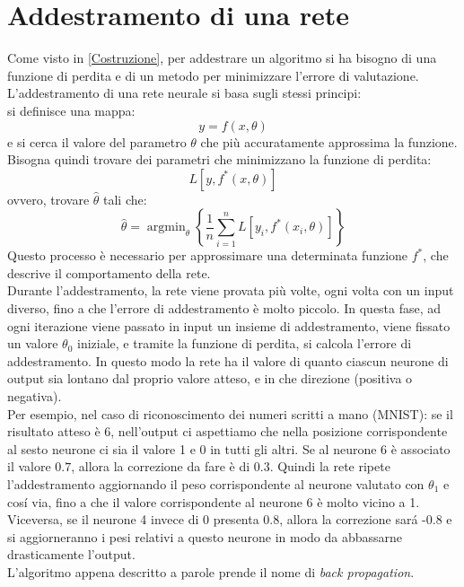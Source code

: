 \documentclass[a4paper,12pt,oneside]{book}
\DeclareMathOperator*{\argmin}{argmin}
\begin{document}
\section{Addestramento di una rete}
Come visto in \ref{Costruzione}, per addestrare un algoritmo si ha bisogno di una funzione di perdita e di un metodo per minimizzare l'errore di valutazione.\\
L'addestramento di una rete neurale si basa sugli stessi principi:\\
si definisce una mappa: $$y=f(x,\theta)$$ e si cerca il valore del parametro $\theta$ che pi\`{u} accuratamente approssima la funzione.
Bisogna quindi trovare dei parametri che minimizzano la funzione di perdita:
$$L[y,f^*(x,\theta)]$$
ovvero, trovare $\hat{\theta}$ tali che:
$$\hat{\theta}=\argmin_{\theta} \left\{ \frac{1}{n} \sum_{i=1}^{n} L[y_i,f^*(x_i,\theta)] \right\}$$
Questo processo \`e necessario per approssimare una determinata funzione $f^*$, che descrive il comportamento della rete.\\
Durante l'addestramento, la rete viene provata pi\`{u} volte, ogni volta con un input diverso, fino a che l'errore di addestramento \`e molto piccolo. In questa fase, ad ogni iterazione viene passato in input un insieme di addestramento, viene fissato un valore $\theta_{0}$ iniziale, e tramite la funzione di perdita, si calcola l'errore di addestramento. In questo modo la rete ha il valore di quanto ciascun neurone di output sia lontano dal proprio valore atteso, e in che direzione (positiva o negativa).\\
Per esempio, nel caso di riconoscimento dei numeri scritti a mano (MNIST):
se il risultato atteso \`e 6, nell'output ci aspettiamo che nella posizione corrispondente al sesto neurone ci sia il valore 1 e 0 in tutti gli altri. Se al neurone 6 \`e associato il valore $0.7$, allora la correzione da fare \`e di 0.3. Quindi la rete ripete l'addestramento aggiornando il peso corrispondente al neurone valutato con $\theta_{1}$ e cos\'{i} via, fino a che il valore corrispondente al neurone 6 \`e molto vicino a 1. Viceversa, se il neurone 4 invece di 0 presenta 0.8, allora la correzione sar\'{a} -0.8 e si aggiorneranno i pesi relativi a questo neurone in modo da abbassarne drasticamente l'output.\\
L'algoritmo appena descritto a parole prende il nome di \textit{back propagation}.
\newpage
\end{document}
